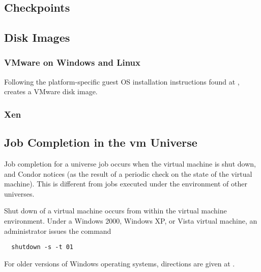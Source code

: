 
\subsection{\label{sec:vm-checkpoints}Checkpoints}
\Todo

\subsection{\label{sec:vm-disk-image-details}Disk Images}

\subsubsection{\label{sec:vm-disk-image-details-vmware}
VMware on Windows and Linux}



Following the platform-specific
guest OS installation instructions found at
,
creates a VMware disk image.

\subsubsection{\label{sec:vm-disk-image-details-xen}Xen}
\Todo

\subsection{\label{sec:vm-job-completion-details}Job Completion in the vm Universe}

Job completion for a  universe job occurs when 
the virtual machine is shut down, and Condor notices 
(as the result of a periodic check on the state of the virtual machine).
This is different from jobs executed under the environment of other 
universes.

Shut down of a virtual machine occurs from within the virtual
machine environment.
Under a Windows 2000, Windows XP, or Vista virtual machine,
an administrator issues the command
\begin{verbatim}
  shutdown -s -t 01
\end{verbatim}
For older versions of Windows operating systems, 
directions are given at
.

